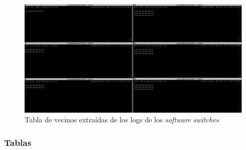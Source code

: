 \begin{figure}
    \begin{center}
        \includegraphics[width=\textwidth]{archivos/img/dev/nb_real.png}
        \caption{Tabla de vecinos extraídas de los logs de los \textit{software switches}}
        \label{fig:nb_real}
    \end{center}
\end{figure}


\subsubsection{Tablas }

